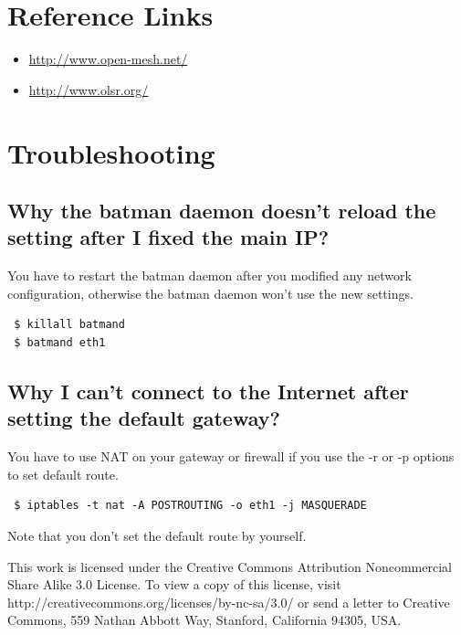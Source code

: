 \documentclass[
	12pt,
	a4paper,
	twoside,
	english,
	headsepline,
	footnosepline,
	automark,
	normalheadings,
	openany,
	cleardoubleplain,
	abstracton,
	idxtotoc,
	liststotoc,
	bibtotoc,
 	BCOR8mm,
]{scrartcl}
\begin{document}
\section{Reference Links}
\begin{itemize}
\item \url{http://www.open-mesh.net/}
\item \url{http://www.olsr.org/}
\end{itemize}

\section{Troubleshooting}
\subsection{Why the batman daemon doesn't reload the setting after I fixed the main IP?}
You have to restart the batman daemon after you modified any network configuration,  otherwise the batman daemon won't use the new settings.
\begin{verbatim}
 $ killall batmand
 $ batmand eth1
\end{verbatim}

\subsection{Why I can't connect to the Internet after setting the default gateway?}
You have to use NAT on your gateway or firewall if you use the -r or -p options to set default route.
\begin{verbatim}
 $ iptables -t nat -A POSTROUTING -o eth1 -j MASQUERADE
\end{verbatim}
Note that you don't set the default route by yourself.

This work is licensed under the Creative Commons Attribution Noncommercial Share Alike 3.0 License. To 
view a copy of this license, visit http://creativecommons.org/licenses/by-nc-sa/3.0/ or send a letter to Creative  Commons, 559 Nathan Abbott Way, Stanford, California 94305, USA.
\end{document}
